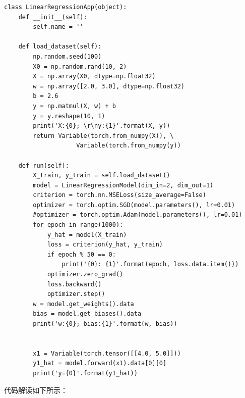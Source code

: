 \documentclass[UTF8]{article}
\begin{document}
\begin{lstlisting}
class LinearRegressionApp(object):
    def __init__(self):
        self.name = ''
        
    def load_dataset(self):
        np.random.seed(100)
        X0 = np.random.rand(10, 2)
        X = np.array(X0, dtype=np.float32)
        w = np.array([2.0, 3.0], dtype=np.float32)
        b = 2.6
        y = np.matmul(X, w) + b
        y = y.reshape(10, 1)
        print('X:{0}; \r\ny:{1}'.format(X, y))
        return Variable(torch.from_numpy(X)), \
                    Variable(torch.from_numpy(y))

    def run(self):
        X_train, y_train = self.load_dataset()
        model = LinearRegressionModel(dim_in=2, dim_out=1)
        criterion = torch.nn.MSELoss(size_average=False)
        optimizer = torch.optim.SGD(model.parameters(), lr=0.01)
        #optimizer = torch.optim.Adam(model.parameters(), lr=0.01)
        for epoch in range(1000):
            y_hat = model(X_train)
            loss = criterion(y_hat, y_train)
            if epoch % 50 == 0:
                print('{0}: {1}'.format(epoch, loss.data.item()))
            optimizer.zero_grad()
            loss.backward()
            optimizer.step()
        w = model.get_weights().data
        bias = model.get_biases().data
        print('w:{0}; bias:{1}'.format(w, bias))
        

        x1 = Variable(torch.tensor([[4.0, 5.0]]))
        y1_hat = model.forward(x1).data[0][0]
        print('y={0}'.format(y1_hat))
\end{lstlisting}
代码解读如下所示：
\end{document}
